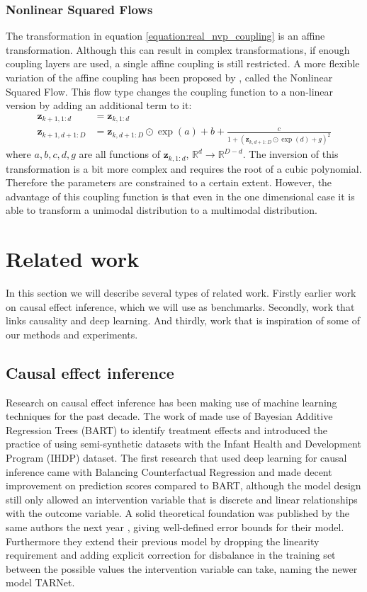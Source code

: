 \documentclass{report}
\newcommand{\R}{\mathbb{R}}
\newcommand{\bz}{\mathbf{z}}
\begin{document}
\subsubsection{Nonlinear Squared Flows}
The transformation in equation \ref{equation:real_nvp_coupling} is an affine transformation. Although this can result in complex transformations, if enough coupling layers are used, a single affine coupling is still restricted. A more flexible variation of the affine coupling has been proposed by \textcite{ziegler2019latent}, called the Nonlinear Squared Flow. This flow type changes the coupling function to a non-linear version by adding an additional term to it:
\begin{align}\label{equation:nonlinear_squared_flow}
    \bz_{k+1, 1:d} &= \bz_{k, 1:d} \\
    \bz_{k+1, d+1:D} &= \bz_{k, d+1:D} \odot \exp (a)  + b + \frac{c}{1 + (\bz_{k, d+1:D} \odot \exp (d) + g)^2}
\end{align}
where $a, b, c, d, g$ are all functions of $\bz_{k, 1:d}$, $\R^{d} \rightarrow \R^{D-d}$. The inversion of this transformation is a bit more complex and requires the root of a cubic polynomial. Therefore the parameters are constrained to a certain extent. However, the advantage of this coupling function is that even in the one dimensional case it is able to transform a unimodal distribution to a multimodal distribution.


\section{Related work}
In this section we will describe several types of related work. Firstly earlier work on causal effect inference, which we will use as benchmarks. Secondly, work that links causality and deep learning. And thirdly, work that is inspiration of some of our methods and experiments.


\subsection{Causal effect inference}
Research on causal effect inference has been making use of machine learning techniques for the past decade. The work of \textcite{hill2011bayesian} made use of Bayesian Additive Regression Trees (BART) \parencite{chipman2010bart} to identify treatment effects and introduced the practice of using semi-synthetic datasets with the Infant Health and Development Program (IHDP) dataset. The first research that used deep learning for causal inference came with Balancing Counterfactual Regression \parencite{johansson2016learning} and made decent improvement on prediction scores compared to BART, although the model design still only allowed an intervention variable that is discrete and linear relationships with the outcome variable. A solid theoretical foundation was published by the same authors the next year \parencite{shalit2017estimating}, giving well-defined error bounds for their model. Furthermore they extend their previous model by dropping the linearity requirement and adding explicit correction for disbalance in the training set between the possible values the intervention variable can take, naming the newer model TARNet.
\end{document}
